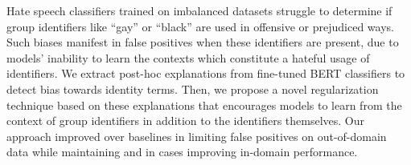 Hate speech classifiers trained on imbalanced datasets struggle to determine if group identifiers like ``gay'' or ``black'' are used in offensive or prejudiced ways. Such biases manifest in false positives when these identifiers are present, due to models' inability to learn the contexts which constitute a hateful usage of identifiers. We extract post-hoc explanations from fine-tuned BERT classifiers to detect bias towards identity terms. Then, we propose a novel regularization technique based on these explanations that encourages models to learn from the context of group identifiers in addition to the identifiers themselves. Our approach improved over baselines in limiting false positives on out-of-domain data while maintaining and in cases improving in-domain performance.
